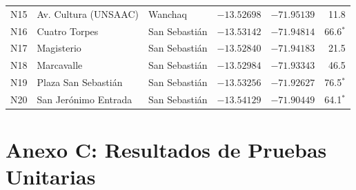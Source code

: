 \begin{table}[h]
\begin{tabular}{lllccr}
        N15 & Av. Cultura (UNSAAC) & Wanchaq & $-13.52698$ & $-71.95139$ & 11.8 \\
        N16 & Cuatro Torpes & San Sebastián & $-13.53142$ & $-71.94814$ & 66.6$^{*}$ \\
        N17 & Magisterio & San Sebastián & $-13.52840$ & $-71.94183$ & 21.5 \\
        N18 & Marcavalle & San Sebastián & $-13.52984$ & $-71.93343$ & 46.5 \\
        N19 & Plaza San Sebastián & San Sebastián & $-13.53256$ & $-71.92627$ & 76.5$^{*}$ \\
        N20 & San Jerónimo Entrada & San Sebastián & $-13.54129$ & $-71.90449$ & 64.1$^{*}$ \\
        \bottomrule
    \end{tabular}
\end{table}

\clearpage
\section*{Anexo C: Resultados de Pruebas Unitarias}

